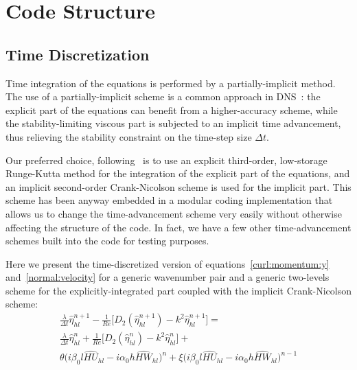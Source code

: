 \chapter{Code Structure}





\section{Time Discretization}
Time integration of the equations is performed by a partially-implicit method.
The use of a partially-implicit scheme is a common approach in DNS~\cite{kim_moin_moser}: the explicit part of the equations can benefit from a higher-accuracy scheme, while the stability-limiting viscous part is subjected to an implicit time advancement, thus relieving the stability constraint on the time-step size $	\Delta t$. \par
Our preferred choice, following~\cite{ns:quadrio}\cite{kim_moin_moser} is to use an explicit third-order, low-storage Runge-Kutta method for the integration of the explicit part of the equations, and an implicit second-order Crank-Nicolson scheme is used for the implicit part. This scheme has been anyway embedded in a modular coding implementation that allows us to change the time-advancement scheme very easily without otherwise affecting the structure of the code. In fact, we have a few other time-advancement schemes built into the code for testing purposes. \par
 Here we present the time-discretized version of equations~\ref{curl:momentum:y} and~\ref{normal:velocity} for a generic wavenumber pair and a generic two-levels scheme for the explicitly-integrated part coupled with the implicit Crank-Nicolson scheme:
\begin{multline}
\frac{\lambda}{\Delta t} \hat{\eta}_{hl}^{n+1} -\frac{1}{Re} \big[ D_{2} (\hat{\eta}_{hl}^{n+1}) - k^{2} \hat{\eta}_{hl}^{n+1} \big] = \\
\frac{\lambda}{\Delta t} \hat{\eta}_{hl}^{n} + \frac{1}{Re} \big[ D_{2} (\hat{\eta}_{hl}^{n}) - k^{2} \hat{\eta}_{hl}^{n} \big] + \\
\theta \bigg( i\beta_{0}l\widehat{HU}_{hl} - i\alpha_{0}h\widehat{HW}_{hl} \bigg)^{n} + \xi \bigg( i\beta_{0}l\widehat{HU}_{hl} - i\alpha_{0}h \widehat{HW}_{hl} \bigg)^{n-1}
\end{multline}
